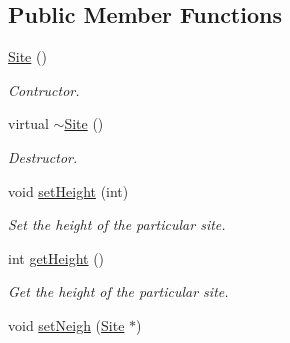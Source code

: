 \subsection*{Public Member Functions}
\begin{DoxyCompactItemize}
\item 
\mbox{\label{classSurfaceTiles_1_1Site_a1bd36f80436f3163aa81e3e793b5809a}} 
\mbox{\hyperlink{classSurfaceTiles_1_1Site_a1bd36f80436f3163aa81e3e793b5809a}{Site}} ()
\begin{DoxyCompactList}\small\item\em Contructor. \end{DoxyCompactList}\item 
\mbox{\label{classSurfaceTiles_1_1Site_a04dcd69e026a6369d248909d4f31ef9e}} 
virtual \mbox{\hyperlink{classSurfaceTiles_1_1Site_a04dcd69e026a6369d248909d4f31ef9e}{$\sim$\+Site}} ()
\begin{DoxyCompactList}\small\item\em Destructor. \end{DoxyCompactList}\item 
\mbox{\label{classSurfaceTiles_1_1Site_abf642ea5cdc37e41663088aeeccb1141}} 
void \mbox{\hyperlink{classSurfaceTiles_1_1Site_abf642ea5cdc37e41663088aeeccb1141}{set\+Height}} (int)
\begin{DoxyCompactList}\small\item\em Set the height of the particular site. \end{DoxyCompactList}\item 
\mbox{\label{classSurfaceTiles_1_1Site_aa6976d7eb9ca03d4eb01638e1d20e46f}} 
int \mbox{\hyperlink{classSurfaceTiles_1_1Site_aa6976d7eb9ca03d4eb01638e1d20e46f}{get\+Height}} ()
\begin{DoxyCompactList}\small\item\em Get the height of the particular site. \end{DoxyCompactList}\item 
\mbox{\label{classSurfaceTiles_1_1Site_a7cd6a0ead9a77195dd811e1b3d7d4914}} 
void \mbox{\hyperlink{classSurfaceTiles_1_1Site_a7cd6a0ead9a77195dd811e1b3d7d4914}{set\+Neigh}} (\mbox{\hyperlink{classSurfaceTiles_1_1Site}{Site}} $\ast$)

\end{DoxyCompactItemize}
